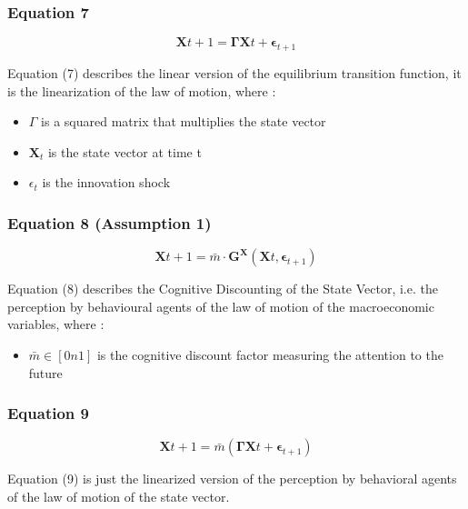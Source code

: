 \documentclass{article}
\begin{document}
\subsubsection*{Equation 7}

\begin{equation}
    \bm{X}{t+1}=\bm{\Gamma}\bm{X}{t}+\bm{\epsilon}_{t+1}
\end{equation}

Equation (7) describes the linear version of the equilibrium transition function, it is the linearization of the law of motion, where :
\begin{itemize}
    \item $\Gamma$ is a squared matrix that multiplies the state vector
    \item $\bm{X}_t$ is the state vector at time t
    \item $\epsilon_{t}$ is the innovation shock
\end{itemize}

\subsubsection*{Equation 8 (Assumption 1)}

\begin{equation}
    \bm{X}{t+1}=\bar{m}\cdot\bm{G}^{\bm{X}}(\bm{X}{t},\bm{\epsilon}_{t+1})
\end{equation}

Equation (8) describes the Cognitive Discounting of the State Vector, i.e. the perception by behavioural agents of the law of motion of the macroeconomic variables, where : 
\begin{itemize}
    \item $\bar{m}\in\left[0n1\right]$ is the cognitive discount factor measuring the attention to the future
\end{itemize}

\subsubsection*{Equation 9}

\begin{equation}
    \bm{X}{t+1}=\bar{m}(\bm{\Gamma}\bm{X}{t}+\bm{\epsilon}_{t+1})
\end{equation}

Equation (9) is just the linearized version of the perception by behavioral agents of the law of motion of the state vector. 
\end{document}
